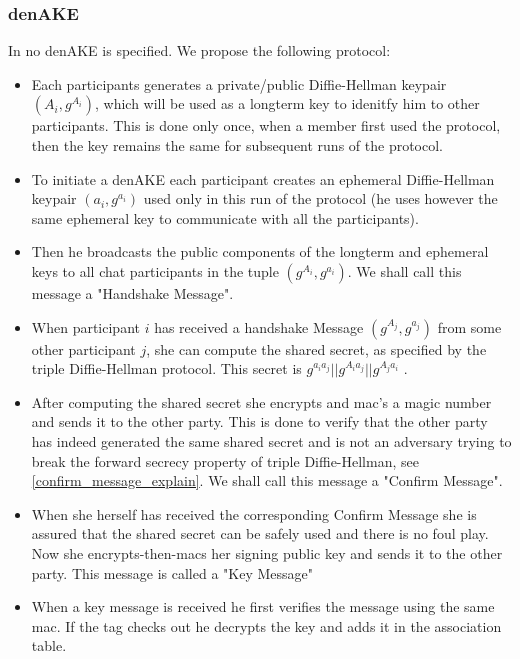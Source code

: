 \documentclass[12pt,titlepage,a4paper]{article}
\begin{document}
{\subsubsection{denAKE}


In \cite{mpotr} no denAKE is specified. We propose the following protocol:

\begin{itemize}

	\item[] Each participants generates a private/public Diffie-Hellman keypair $(A_i, g^{A_i})$, which
will be used as a longterm key to idenitfy him to other participants. This
is done only once, when a member first used the protocol, then the key remains
the same for subsequent runs of the protocol.

	\item[] To initiate a denAKE each participant creates an ephemeral Diffie-Hellman keypair
		$(a_i,g^{a_i})$ used only in this run of the protocol (he uses however the same ephemeral key
		to communicate with all the participants).

	\item[] Then he broadcasts the public components of the longterm and ephemeral keys to
		all chat participants in the tuple $(g^{A_i}, g^{a_i})$. We shall call this
		message a "Handshake Message".

	\item[] When participant $i$ has received a handshake Message $(g^{A_j}, g^{a_j})$ from some
		other participant $j$, she can compute the shared secret, as specified by the triple
		Diffie-Hellman protocol. This secret is $g^{a_ia_j} || g^{A_ia_j} || g^{A_ja_i}$
		.

	\item[] After computing the shared secret she encrypts and mac's a magic number and sends it
		to the other party. This is done to verify that the other party has indeed generated
		the same shared secret and is not an adversary trying to break the forward secrecy
		property of triple Diffie-Hellman, see \ref{confirm_message_explain}. We shall call
		this message a "Confirm Message".

	\item[] When she herself has received the corresponding Confirm Message she is assured that
		the shared secret can be safely used and there is no foul play. Now she
		encrypts-then-macs her signing public key and sends it to the other party. This
		message is called a "Key Message"


	\item[] When a key message is received he first verifies the message using the same mac.
		If the tag checks out he decrypts the key and adds it in the association table.
\end{itemize}

}
\end{document}
